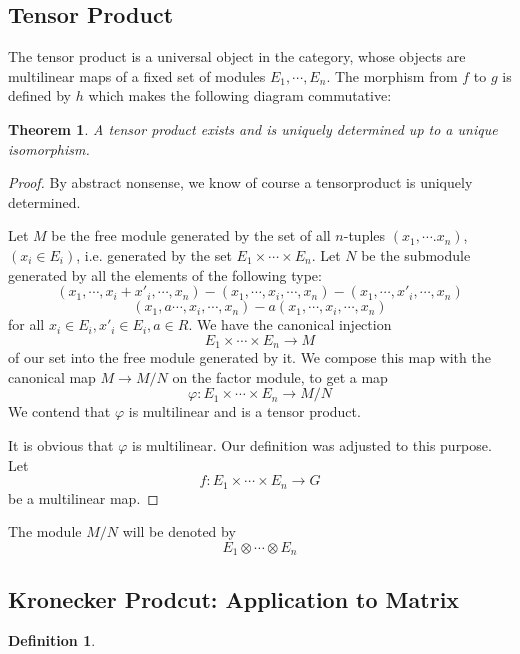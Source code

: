 \documentclass{book}
\newtheorem{theorem}{Theorem}[section]
\theoremstyle{definition}
\newtheorem{definition}{Definition}[section]
\begin{document}
\subsection{Tensor Product}
The tensor product is a universal object in the category, whose objects are multilinear maps of a fixed set of modules $E_1,\cdots,E_n$. The morphism from $f$ to $g$ is defined by $h$ which makes the following diagram commutative: 
\par
\begin{theorem}
A tensor product exists and is uniquely determined up to a unique isomorphism.\
\end{theorem}
\begin{proof}
By abstract nonsense, we know of course a tensorproduct is uniquely determined. \par
Let $M$ be the free module generated by the set of all $n$-tuples $(x_1,\cdots.x_n)$,$(x_i\in E_i)$, i.e. generated by the set $E_1\times\cdots\times E_n$. Let $N$ be the submodule generated by all the elements of the following type:
\[(x_1,\cdots,x_i+x'_i,\cdots,x_n)-(x_1,\cdots,x_i,\cdots,x_n)-(x_1,\cdots,x'_i,\cdots,x_n)\]
\[(x_1,a\cdots,x_i,\cdots,x_n)-a(x_1,\cdots,x_i,\cdots,x_n)\]
for all $x_i\in E_i,x'_i\in E_i,a\in R$. We have the canonical injection \[E_1\times\cdots\times E_n\longrightarrow M\]of our set into the free module generated by it. We compose this map with the canonical map $M\longrightarrow M/N$ on the factor module, to get a map \[\varphi : E_1\times\cdots\times E_n\longrightarrow M/N\]
We contend that $\varphi$ is multilinear and is a tensor product.\par
It is obvious that $\varphi$ is multilinear. Our definition was adjusted to this purpose. Let \[f:E_1\times\cdots\times E_n\longrightarrow G\] be a multilinear map. 
\end{proof}
The module $M/N$ will be denoted by \[E_1\otimes\cdots\otimes E_n\]


\subsection{Kronecker Prodcut: Application to Matrix}
\begin{definition}

\end{definition}
\end{document}

